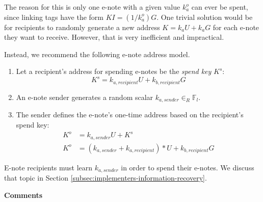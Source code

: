 The reason for this is only one e-note with a given value $k^o_a$ can ever be spent, since linking tags have the form $KI = (1/k^o_a) G$. One trivial solution would be for recipients to randomly generate a new address $K = k_a U + k_a G$ for each e-note they want to receive. However, that is very inefficient and impractical.

Instead, we recommend the following e-note address model.

\begin{enumerate}
    \item Let a recipient's address for spending e-notes be the {\em spend key} $K^s$:\vspace{.115cm}
    \[K^s = k_{a, recipient} U + k_{b, recipient} G\]

    \item An e-note sender generates a random scalar $k_{a, sender} \in_R \mathbb{F}_l$.

    \item The sender defines the e-note's one-time address based on the recipient's spend key:\vspace{.115cm}
    \begin{align*}
        K^o &= k_{a, sender} U + K^s \\
        K^o &= (k_{a, sender} + k_{a, recipient})*U + k_{b, recipient} G
    \end{align*}
\end{enumerate}

E-note recipients must learn $k_{a, sender}$ in order to spend their e-notes. We discuss that topic in Section \ref{subsec:implementers-information-recovery}.

\textbf{Comments}

